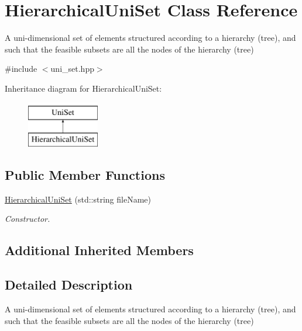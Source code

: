 \hypertarget{classHierarchicalUniSet}{\section{Hierarchical\-Uni\-Set Class Reference}
\label{classHierarchicalUniSet}
}


A uni-\/dimensional set of elements structured according to a hierarchy (tree), and such that the feasible subsets are all the nodes of the hierarchy (tree)  




{\ttfamily \#include $<$uni\-\_\-set.\-hpp$>$}

Inheritance diagram for Hierarchical\-Uni\-Set\-:\begin{figure}[H]
\begin{center}
\leavevmode
\includegraphics[height=2.000000cm]{classHierarchicalUniSet}
\end{center}
\end{figure}
\subsection*{Public Member Functions}
\begin{DoxyCompactItemize}
\item 
\hyperlink{classHierarchicalUniSet_aeb0f207ca4c762dcbf825b05a0839d6b}{Hierarchical\-Uni\-Set} (std\-::string file\-Name)
\begin{DoxyCompactList}\small\item\em Constructor. \end{DoxyCompactList}\end{DoxyCompactItemize}
\subsection*{Additional Inherited Members}


\subsection{Detailed Description}
A uni-\/dimensional set of elements structured according to a hierarchy (tree), and such that the feasible subsets are all the nodes of the hierarchy (tree) 

